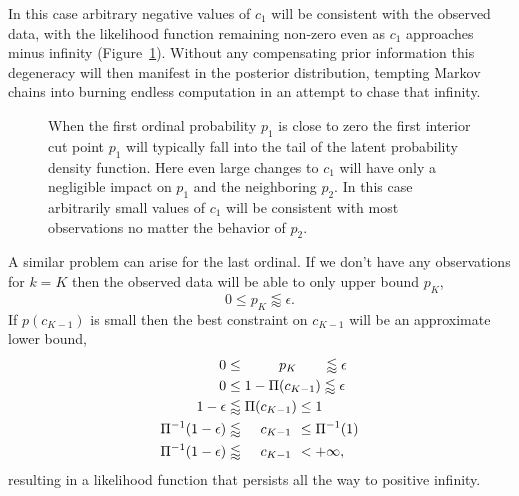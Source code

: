 \documentclass[
  letterpaper,
  DIV=11,
  numbers=noendperiod]{scrartcl}
\begin{document}
In this case arbitrary negative values of \(c_{1}\) will be consistent
with the observed data, with the likelihood function remaining non-zero
even as \(c_{1}\) approaches minus infinity
(Figure~\ref{fig-tail-degen}). Without any compensating prior
information this degeneracy will then manifest in the posterior
distribution, tempting Markov chains into burning endless computation in
an attempt to chase that infinity.

\begin{figure}


\caption{\label{fig-tail-degen}When the first ordinal probability
\(p_{1}\) is close to zero the first interior cut point \(p_{1}\) will
typically fall into the tail of the latent probability density function.
Here even large changes to \(c_{1}\) will have only a negligible impact
on \(p_{1}\) and the neighboring \(p_{2}\). In this case arbitrarily
small values of \(c_{1}\) will be consistent with most observations no
matter the behavior of \(p_{2}\).}

\end{figure}%

A similar problem can arise for the last ordinal. If we don't have any
observations for \(k = K\) then the observed data will be able to only
upper bound \(p_{K}\), \[
0 \le p_{K} \lessapprox \epsilon.
\] If \(p(c_{K - 1})\) is small then the best constraint on
\(c_{K - 1}\) will be an approximate lower bound, \begin{align*}
0 &\le \hphantom{1 - \Pi} p_{K} \hphantom{(_{-1})} \lessapprox \epsilon
\\
0 &\le 1 - \Pi(c_{K - 1}) \lessapprox \epsilon
\\
1 - \epsilon &\lessapprox \Pi(c_{K - 1}) \le 1
\\
\Pi^{-1}(1 - \epsilon) &\lessapprox
\hphantom{\Pi(} c_{K - 1} \hphantom{)} \le
\Pi^{-1}(1)
\\
\Pi^{-1}(1 - \epsilon) &\lessapprox
\hphantom{\Pi(} c_{K - 1} \hphantom{)} <
+\infty,
\end{align*} resulting in a likelihood function that persists all the
way to positive infinity.
\end{document}
